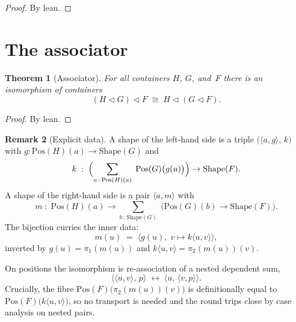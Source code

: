 \documentclass[11pt,a4paper]{article}
\theoremstyle{plain}
\newtheorem{theorem}{Theorem}[section]
\theoremstyle{definition}
\newtheorem{remark}[theorem]{Remark}
\newcommand{\Shape}{\mathrm{Shape}}
\newcommand{\Pos}{\mathrm{Pos}}
\newcommand{\seqop}{\mathbin{\triangleleft}}
\begin{document}
\begin{proof}
By lean.
\end{proof}

\section{The associator}

\begin{theorem}[Associator]\label{thm:associator}
For all containers $H$, $G$, and~$F$ there is an isomorphism of
containers
\begin{equation}
  (H \seqop G) \seqop F
  \;\cong\;
  H \seqop (G \seqop F).
\end{equation}
\end{theorem}

\begin{proof}
By lean.
\end{proof}

\begin{remark}[Explicit data]
A shape of the left-hand side is a triple
$\bigl(\langle a, g \rangle,\, k\bigr)$ with
$g : \Pos(H)(a) \to \Shape(G)$ and
\[
  k \;:\;
  \Bigl(
    \sum_{u \,:\, \Pos(H)(a)}\;
    \Pos(G)\bigl(g(u)\bigr)
  \Bigr)
  \to
  \Shape(F).
\]
A shape of the right-hand side is a pair $\langle a, m \rangle$ with
\[
  m \;:\;
  \Pos(H)(a)
  \to
  \sum_{b \,:\, \Shape(G)}\;
  \bigl(\Pos(G)(b) \to \Shape(F)\bigr).
\]
The bijection curries the inner data:
\begin{equation}
  m(u) \;=\; \bigl\langle g(u),\; v \mapsto k\langle u, v \rangle \bigr\rangle,
\end{equation}
inverted by $g(u) = \pi_1(m(u))$ and
$k\langle u, v \rangle = \pi_2(m(u))(v)$.

On positions the isomorphism is re-association of a nested dependent
sum,
\begin{equation}
  \bigl\langle \langle u, v \rangle,\, p \bigr\rangle
  \;\longleftrightarrow\;
  \bigl\langle u,\, \langle v, p \rangle \bigr\rangle.
\end{equation}
 Crucially, the fibre
$\Pos(F)\bigl(\pi_2(m(u))(v)\bigr)$ is definitionally equal to
$\Pos(F)\bigl(k\langle u, v \rangle\bigr)$, so no transport is needed
and the round trips close by case analysis on nested pairs.
\end{remark}

\end{document}
